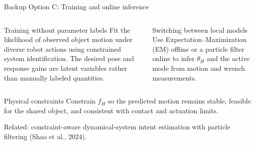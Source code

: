 \documentclass[aspectratio=169,11pt]{beamer}
\begin{document}
\begin{frame}{Backup Option C: Training and online inference}
\begin{columns}[T,onlytextwidth]
\begin{block}{Training without parameter labels}
Fit the likelihood of observed object motion under diverse robot actions using constrained system identification. The desired pose and response gains are latent variables rather than manually labeled quantities.
\end{block}
\begin{block}{Switching between local models}
Use Expectation--Maximization (EM) offline or a particle filter online to infer $\theta_H$ and the active mode from motion and wrench measurements.
\end{block}
\end{columns}
\vspace{0.2cm}
\begin{alertblock}{Physical constraints}
Constrain $f_H$ so the predicted motion remains stable, feasible for the shared object, and consistent with contact and actuation limits.
\end{alertblock}
\vspace{0.12cm}
Related: constraint-aware dynamical-system intent estimation with particle filtering (Shao et al., 2024).
\end{frame}
\end{document}
